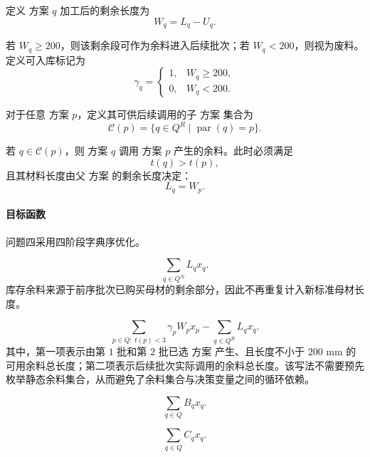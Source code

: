 \documentclass[UTF8]{ctexart}
\begin{document}
定义 方案 $q$ 加工后的剩余长度为
\begin{equation}
W_q=L_q-U_q.
\label{eq:p4_Wq}
\end{equation}

若 $W_q\geq 200$，则该剩余段可作为余料进入后续批次；若 $W_q<200$，则视为废料。定义可入库标记为
\begin{equation}
\gamma_q=\begin{cases}1, & W_q\geq 200,\\0, & W_q<200.\end{cases}
\label{eq:p4_gamma}
\end{equation}

对于任意 方案 $p$，定义其可供后续调用的子 方案 集合为
\begin{equation}
\mathcal C(p)=\{q\in Q^R\mid \operatorname{par}(q)=p\}.
\label{eq:p4_Cset}
\end{equation}

若 $q\in\mathcal C(p)$，则 方案 $q$ 调用 方案 $p$ 产生的余料。此时必须满足
\begin{equation}
t(q)>t(p),
\label{eq:p4_timeorder}
\end{equation}
且其材料长度由父 方案 的剩余长度决定：
\begin{equation}
L_q=W_p.
\label{eq:p4_LqWp}
\end{equation}

\paragraph{目标函数}

问题四采用四阶段字典序优化。

\begin{equation}
\sum_{q\in Q^N}L_qx_q.
\label{eq:p4_F1}
\end{equation}
库存余料来源于前序批次已购买母材的剩余部分，因此不再重复计入新标准母材长度。

\begin{equation}
\sum_{p\in Q:\ t(p)<3}\gamma_p W_p x_p
-
\sum_{q\in Q^R}L_qx_q.
\label{eq:p4_F2}
\end{equation}
其中，第一项表示由第 $1$ 批和第 $2$ 批已选 方案 产生、且长度不小于 $200$ mm 的可用余料总长度；第二项表示后续批次实际调用的余料总长度。该写法不需要预先枚举静态余料集合，从而避免了余料集合与决策变量之间的循环依赖。

\begin{equation}
\sum_{q\in Q}B_qx_q.
\label{eq:p4_F3}
\end{equation}

\begin{equation}
\sum_{q\in Q}C_qx_q.
\label{eq:p4_F4}
\end{equation}
\end{document}
